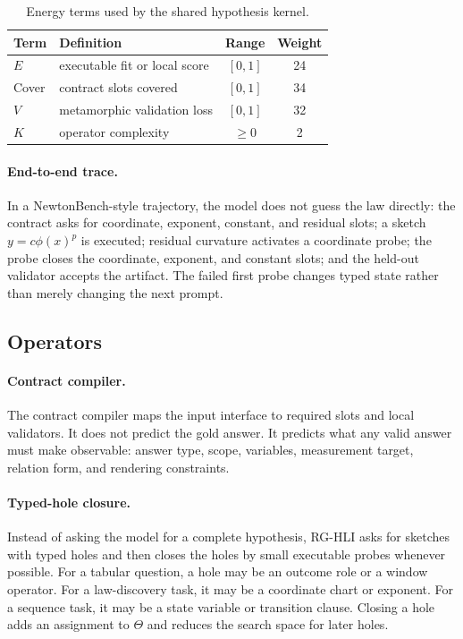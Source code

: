 \documentclass[letterpaper]{article}
\newcommand{\tblhdr}{\rowcolor{headerrow}}
\newcommand{\methodshort}{\textsc{RG-HLI}\xspace}
\begin{document}
\begin{table}[H]
\centering
\caption{Energy terms used by the shared hypothesis kernel.}
\label{tab:score_terms}
\small
\setlength{\tabcolsep}{4pt}
\begin{tabularx}{\columnwidth}{@{}lYcc@{}}
\toprule
\tblhdr
Term & Definition & Range & Weight \\
\midrule
$E$ & executable fit or local score & $[0,1]$ & 24 \\
Cover & contract slots covered & $[0,1]$ & 34 \\
$V$ & metamorphic validation loss & $[0,1]$ & 32 \\
$K$ & operator complexity & $\geq0$ & 2 \\
\bottomrule
\end{tabularx}
\end{table}

\paragraph{End-to-end trace.}
In a NewtonBench-style trajectory, the model does not guess the law directly:
the contract asks for coordinate, exponent, constant, and residual slots; a
sketch $y=c\phi(x)^p$ is executed; residual curvature activates a coordinate
probe; the probe closes the coordinate, exponent, and constant slots; and the
held-out validator accepts the artifact. The
failed first probe changes typed state rather than merely changing the next
prompt.

\subsection{Operators}

\paragraph{Contract compiler.}
The contract compiler maps the input interface to required slots and local
validators. It does not predict the gold answer. It predicts what any valid
answer must make observable: answer type, scope, variables, measurement target,
relation form, and rendering constraints.

\paragraph{Typed-hole closure.}
Instead of asking the model for a complete hypothesis, \methodshort asks for sketches
with typed holes and then closes the holes by small executable probes whenever
possible. For a tabular question, a hole may be an outcome role or a window
operator. For a law-discovery task, it may be a coordinate chart or exponent.
For a sequence task, it may be a state variable or transition clause. Closing a
hole adds an assignment to $\Theta$ and reduces the search space for later
holes.
\end{document}

